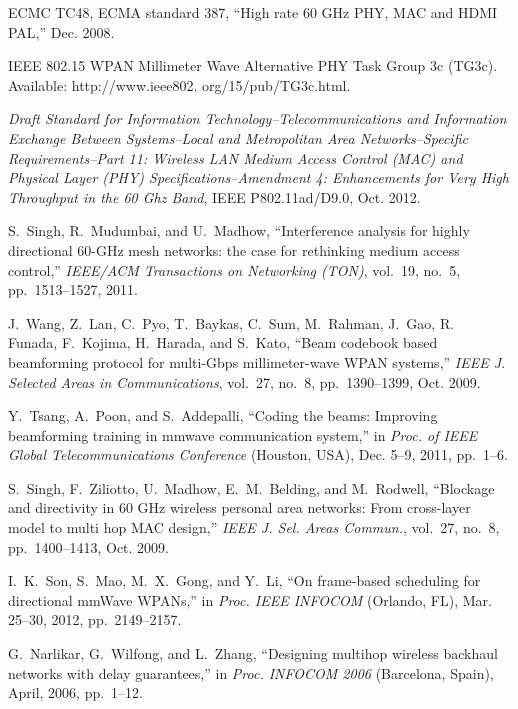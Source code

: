 \documentclass[journal]{IEEEtran}
\begin{document}
\begin{thebibliography}{10}
 ECMC TC48, ECMA standard 387, ``High rate 60 GHz PHY, MAC and HDMI PAL,'' Dec. 2008.

 IEEE 802.15 WPAN Millimeter Wave Alternative PHY Task Group 3c
(TG3c). Available: http://www.ieee802. org/15/pub/TG3c.html.

 \emph{Draft Standard for Information Technology--Telecommunications and Information
Exchange Between Systems--Local and Metropolitan Area
Networks--Specific Requirements--Part 11: Wireless LAN Medium
Access Control (MAC) and Physical Layer (PHY) Specifications--Amendment 4: Enhancements for Very High Throughput in the 60 Ghz
Band}, IEEE P802.11ad/D9.0, Oct. 2012.

S.~Singh, R.~Mudumbai, and U.~Madhow, ``Interference analysis for highly directional 60-GHz mesh
networks: the case for rethinking medium access control,'' \emph{IEEE/ACM Transactions on
Networking (TON)}, vol.~19, no.~5, pp.~1513--1527, 2011.



J.~Wang, Z.~Lan, C.~Pyo, T.~Baykas, C.~Sum, M.~Rahman, J.~Gao, R.~ Funada, F.~Kojima, H.~Harada,
and S.~Kato, ``Beam codebook based beamforming protocol for multi-Gbps millimeter-wave WPAN
systems,'' \emph{IEEE J. Selected Areas in Communications}, vol.~27, no.~8, pp.~1390--1399, Oct.
2009.

Y.~Tsang, A.~Poon, and S.~Addepalli, ``Coding the beams: Improving beamforming training in mmwave
communication system,'' in \emph{Proc. of IEEE Global Telecommunications Conference} (Houston,
USA), Dec. 5--9, 2011, pp.~1--6.

 S.~Singh, F.~Ziliotto, U.~Madhow, E.~M.~Belding, and M.~Rodwell, ``Blockage and directivity in 60
GHz wireless personal area networks: From cross-layer model to multi hop MAC design,'' \emph{IEEE
J. Sel. Areas Commun.}, vol.~27, no.~8, pp.~1400--1413, Oct. 2009.


I.~K.~Son, S.~Mao, M.~X.~Gong, and Y.~Li, ``On frame-based scheduling for directional mmWave
WPANs,'' in \emph{Proc. IEEE INFOCOM} (Orlando, FL), Mar. 25--30, 2012, pp.~2149--2157.



G.~Narlikar, G.~Wilfong, and L.~Zhang, ``Designing multihop wireless backhaul networks with delay
guarantees,'' in \emph{Proc. INFOCOM 2006} (Barcelona, Spain), April, 2006, pp.~1--12.




\end{thebibliography}
\end{document}
